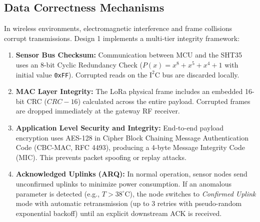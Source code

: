 \documentclass[12pt]{article}
\begin{document}
\subsection{Data Correctness Mechanisms}
In wireless environments, electromagnetic interference and frame collisions corrupt transmissions. Design 1 implements a multi-tier integrity framework:
\begin{enumerate}
    \item \textbf{Sensor Bus Checksum:} Communication between MCU and the SHT35 uses an 8-bit Cyclic Redundancy Check ($P(x) = x^8 + x^5 + x^4 + 1$ with initial value \texttt{0xFF}). Corrupted reads on the $\text{I}^2\text{C}$ bus are discarded locally.
    \item \textbf{MAC Layer Integrity:} The LoRa physical frame includes an embedded 16-bit CRC ($CRC-16$) calculated across the entire payload. Corrupted frames are dropped immediately at the gateway RF receiver.
    \item \textbf{Application Level Security and Integrity:} End-to-end payload encryption uses AES-128 in Cipher Block Chaining Message Authentication Code (CBC-MAC, RFC 4493), producing a 4-byte Message Integrity Code (MIC). This prevents packet spoofing or replay attacks.
    \item \textbf{Acknowledged Uplinks (ARQ):} In normal operation, sensor nodes send unconfirmed uplinks to minimize power consumption. If an anomalous parameter is detected (e.g., $T > 38^\circ\text{C}$), the node switches to \textit{Confirmed Uplink} mode with automatic retransmission (up to 3 retries with pseudo-random exponential backoff) until an explicit downstream ACK is received.
\end{enumerate}
\end{document}
